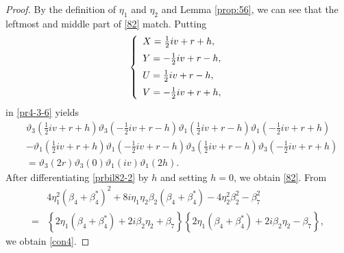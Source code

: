 \documentclass[10pt,leqno]{amsart}
\numberwithin{equation}{section}
\begin{document}
\begin{proof}
By the definition of $\eta_{1}$ and $\eta_{2}$ and Lemma \ref{prop:56}, we can see that the leftmost and middle part of \eqref{82} match.
Putting
\begin{eqnarray}\label{prbil82-1}
\left\{
\begin{array}{l}
\vspace{2mm}
X=\frac{1}{2}iv+r+h,\\
\vspace{2mm}
Y=-\frac{1}{2}iv+r-h,\\
\vspace{2mm}
U=\frac{1}{2}iv+r-h,\\
V=-\frac{1}{2}iv+r+h,\\
\end{array}
\right.
\end{eqnarray}
in \eqref{pr4-3-6} yields
\begin{equation}\label{prbil82-2}
\begin{split}
&\vartheta_3\left(\frac{1}{2}iv+r+h\right)\vartheta_3\left(-\frac{1}{2}iv+r-h\right)\vartheta_1\left(\frac{1}{2}iv+r-h\right)\vartheta_1\left(-\frac{1}{2}iv+r+h\right)\\
&-\vartheta_1\left(\frac{1}{2}iv+r+h\right)\vartheta_1\left(-\frac{1}{2}iv+r-h\right)\vartheta_3\left(\frac{1}{2}iv+r-h\right)\vartheta_3\left(-\frac{1}{2}iv+r+h\right)\\
&=\vartheta_3\left(2r\right)\vartheta_3\left(0\right)\vartheta_1\left(iv\right)\vartheta_1\left(2h\right).
\end{split}
\end{equation}
After differentiating \eqref{prbil82-2} by $h$ and setting $h=0$, we obtain \eqref{82}. 
From
\begin{equation}
\begin{split}
&4\eta_{1}^{2}\left(\beta_{4}+\beta_{4}^{*}\right)^{2}+8i\eta_{1}\eta_{2}\beta_{2}\left(\beta_{4}+\beta_{4}^{*}\right)-4\eta_{2}^{2}\beta_{2}^{2}-\beta_{7}^{2}\\
=&\left\{2\eta_{1}\left(\beta_{4}+\beta_{4}^{*}\right)+2i\beta_{2}\eta_{2}+\beta_{7}\right\}\left\{2\eta_{1}\left(\beta_{4}+\beta_{4}^{*}\right)+2i\beta_{2}\eta_{2}-\beta_{7}\right\},
\end{split}
\end{equation}
we obtain \eqref{con4}.
\end{proof}
\end{document}
